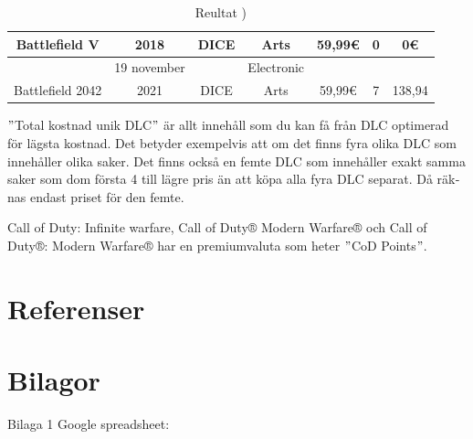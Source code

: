 \documentclass[11p]{article}
\begin{document}
\begin{otherlanguage}{swedish}
\begin{table}[htbp]
\begin{tabular}{|c|c|c|c|c|c|c|}
            Battlefield V & 2018 & DICE & Arts & 59,99€ & 0 & 0€\\
            \hline
            & 19 november && Electronic &&&\\ [-2pt]
            Battlefield 2042 & 2021 & DICE &  Arts & 59,99€ & 7 & 138,94\\
            \hline
        \end{tabular}
        \caption{Reultat )}
        \label{tab:Resultat}
    \end{table}
    \("\)Total kostnad unik DLC\("\) är allt innehåll som du kan få från DLC optimerad för lägsta kostnad.
    Det betyder exempelvis att om det finns fyra olika DLC som innehåller olika saker.
    Det finns också en femte DLC som innehåller exakt samma saker som dom första 4 till lägre pris än att köpa alla fyra DLC separat.
    Då räknas endast priset för den femte.

    Call of Duty: Infinite warfare, Call of Duty® Modern Warfare® och Call of Duty®: Modern Warfare® har en premiumvaluta som heter \("\)CoD Points\("\).



    \newpage
    \section{Referenser}
    \printbibliography[heading=none]

    \newpage
    \section{Bilagor}
    Bilaga 1
    Google spreadsheet:

    \end{otherlanguage}
\end{document}
